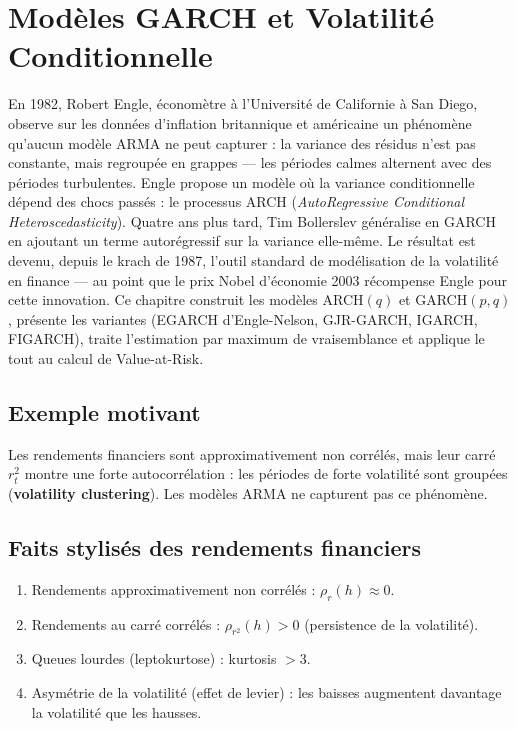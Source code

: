 \chapter{Mod\`eles GARCH et Volatilit\'e Conditionnelle}
\label{ch:garch}

En 1982, Robert Engle, économètre à l'Université de Californie à San Diego, observe sur les données d'inflation britannique et américaine un phénomène qu'aucun modèle ARMA ne peut capturer : la variance des résidus n'est pas constante, mais regroupée en grappes --- les périodes calmes alternent avec des périodes turbulentes. Engle propose un modèle où la variance conditionnelle dépend des chocs passés : le processus ARCH (\emph{AutoRegressive Conditional Heteroscedasticity}). Quatre ans plus tard, Tim Bollerslev généralise en GARCH en ajoutant un terme autorégressif sur la variance elle-même. Le résultat est devenu, depuis le krach de 1987, l'outil standard de modélisation de la volatilité en finance --- au point que le prix Nobel d'économie 2003 récompense Engle pour cette innovation. Ce chapitre construit les modèles ARCH$(q)$ et GARCH$(p,q)$, présente les variantes (EGARCH d'Engle-Nelson, GJR-GARCH, IGARCH, FIGARCH), traite l'estimation par maximum de vraisemblance et applique le tout au calcul de Value-at-Risk.

\section{Exemple motivant}
Les rendements financiers sont approximativement non corr\'el\'es, mais leur carr\'e $r_t^2$ montre une forte autocorr\'elation : les p\'eriodes de forte volatilit\'e sont group\'ees (\textbf{volatility clustering}). Les mod\`eles ARMA ne capturent pas ce ph\'enom\`ene.

\section{Faits stylis\'es des rendements financiers}

\begin{enumerate}
\item Rendements approximativement non corr\'el\'es : $\rho_{r}(h)\approx 0$.
\item Rendements au carr\'e corr\'el\'es : $\rho_{r^2}(h)>0$ (persistence de la volatilit\'e).
\item Queues lourdes (leptokurtose) : kurtosis $>3$.
\item Asym\'etrie de la volatilit\'e (effet de levier) : les baisses augmentent davantage la volatilit\'e que les hausses.
\end{enumerate}

